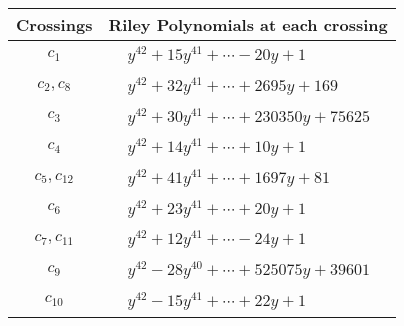 \documentclass[1p]{elsarticle_modified}
\theoremstyle{definition}
\begin{document}
\begin{tabular}{m{50pt}|m{274pt}}
Crossings & \hspace{64pt}Riley Polynomials at each crossing \\
\hline $$\begin{aligned}c_{1}\end{aligned}$$&$\begin{aligned}
&y^{42}+15 y^{41}+\cdots-20 y+1
\end{aligned}$\\
\hline $$\begin{aligned}c_{2},c_{8}\end{aligned}$$&$\begin{aligned}
&y^{42}+32 y^{41}+\cdots+2695 y+169
\end{aligned}$\\
\hline $$\begin{aligned}c_{3}\end{aligned}$$&$\begin{aligned}
&y^{42}+30 y^{41}+\cdots+230350 y+75625
\end{aligned}$\\
\hline $$\begin{aligned}c_{4}\end{aligned}$$&$\begin{aligned}
&y^{42}+14 y^{41}+\cdots+10 y+1
\end{aligned}$\\
\hline $$\begin{aligned}c_{5},c_{12}\end{aligned}$$&$\begin{aligned}
&y^{42}+41 y^{41}+\cdots+1697 y+81
\end{aligned}$\\
\hline $$\begin{aligned}c_{6}\end{aligned}$$&$\begin{aligned}
&y^{42}+23 y^{41}+\cdots+20 y+1
\end{aligned}$\\
\hline $$\begin{aligned}c_{7},c_{11}\end{aligned}$$&$\begin{aligned}
&y^{42}+12 y^{41}+\cdots-24 y+1
\end{aligned}$\\
\hline $$\begin{aligned}c_{9}\end{aligned}$$&$\begin{aligned}
&y^{42}-28 y^{40}+\cdots+525075 y+39601
\end{aligned}$\\
\hline $$\begin{aligned}c_{10}\end{aligned}$$&$\begin{aligned}
&y^{42}-15 y^{41}+\cdots+22 y+1
\end{aligned}$\\
\hline
\end{tabular}\\~\\
\end{document}
